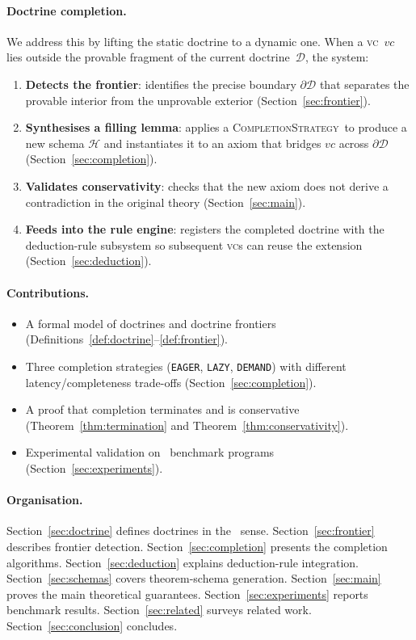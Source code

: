 \documentclass[11pt]{article}
\newcommand{\Doct}{\mathcal{D}}           %
\newcommand{\DoctF}{\partial\Doct}        %
\newcommand{\VC}{\mathit{vc}}             %
\newcommand{\Schm}{\mathcal{H}}           %
\newcommand{\EAGER}{\texttt{EAGER}}
\newcommand{\LAZY}{\texttt{LAZY}}
\newcommand{\DEMAND}{\texttt{DEMAND}}
\newcommand{\CompStrat}{\textsc{CompletionStrategy}}
\begin{document}
\paragraph{Doctrine completion.}
We address this by lifting the static doctrine to a dynamic one.  When
a \textsc{vc}~$\VC$ lies outside the provable fragment of the current
doctrine~$\Doct$, the system:

\begin{enumerate}[leftmargin=2em,label=(\roman*)]
\item \textbf{Detects the frontier}: identifies the precise boundary
  $\DoctF$ that separates the provable interior from the unprovable
  exterior (Section~\ref{sec:frontier}).
\item \textbf{Synthesises a filling lemma}: applies a
  \CompStrat\ to produce a new schema $\Schm$ and instantiates it
  to an axiom that bridges $\VC$ across $\DoctF$
  (Section~\ref{sec:completion}).
\item \textbf{Validates conservativity}: checks that the new axiom
  does not derive a contradiction in the original theory
  (Section~\ref{sec:main}).
\item \textbf{Feeds into the rule engine}: registers the completed
  doctrine with the deduction-rule subsystem so subsequent
  \textsc{vc}s can reuse the extension
  (Section~\ref{sec:deduction}).
\end{enumerate}

\paragraph{Contributions.}
\begin{itemize}[leftmargin=2em]
  \item A formal model of doctrines and doctrine frontiers
        (Definitions~\ref{def:doctrine}--\ref{def:frontier}).
  \item Three completion strategies (\EAGER, \LAZY, \DEMAND) with
        different latency/completeness trade-offs
        (Section~\ref{sec:completion}).
  \item A proof that completion terminates and is conservative
        (Theorem~\ref{thm:termination} and
        Theorem~\ref{thm:conservativity}).
  \item Experimental validation on \numcases\ benchmark programs
        (Section~\ref{sec:experiments}).
\end{itemize}

\paragraph{Organisation.}
Section~\ref{sec:doctrine} defines doctrines in the \JuGeo\ sense.
Section~\ref{sec:frontier} describes frontier detection.
Section~\ref{sec:completion} presents the completion algorithms.
Section~\ref{sec:deduction} explains deduction-rule integration.
Section~\ref{sec:schemas} covers theorem-schema generation.
Section~\ref{sec:main} proves the main theoretical guarantees.
Section~\ref{sec:experiments} reports benchmark results.
Section~\ref{sec:related} surveys related work.
Section~\ref{sec:conclusion} concludes.
\end{document}
